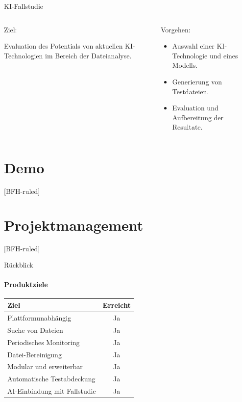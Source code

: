 \documentclass[
    ngerman,%
    authorontitle=true,
]{bfhbeamer}
\begin{document}
    \begin{frame}{KI-Fallstudie}
        \begin{columns}
            \begin{column}{0.5\textwidth}
                Ziel:
                \item Evaluation des Potentials von aktuellen KI-Technologien im Bereich der Dateianalyse.
            \end{column}
            \begin{column}{0.5\textwidth}
                Vorgehen:
                \begin{itemize}
                    \item Auswahl einer KI-Technologie und eines Modells.
                    \item Generierung von Testdateien.
                    \item Evaluation und Aufbereitung der Resultate.
                \end{itemize}
            \end{column}
        \end{columns}
    \end{frame}

    \section{Demo}\label{sec:demo}
    [BFH-ruled]
    \frame{\sectionpage}

    \section{Projektmanagement}\label{sec:projektmanagement}
    [BFH-ruled]
    \frame{\sectionpage}

    \begin{frame}{Rückblick}
        \framesubtitle{Produktziele}
        {
            \centering
            \begin{tabular}{l|c}
                \textbf{Ziel}                & \textbf{Erreicht} \\
                \hline
                Plattformunabhängig          & Ja                \\
                Suche von Dateien            & Ja                \\
                Periodisches Monitoring      & Ja                \\
                Datei-Bereinigung            & Ja                \\
                Modular und erweiterbar      & Ja                \\
                Automatische Testabdeckung   & Ja                \\
                AI-Einbindung mit Fallstudie & Ja                \\
            \end{tabular}\par
        }

    \end{frame}
\end{document}

